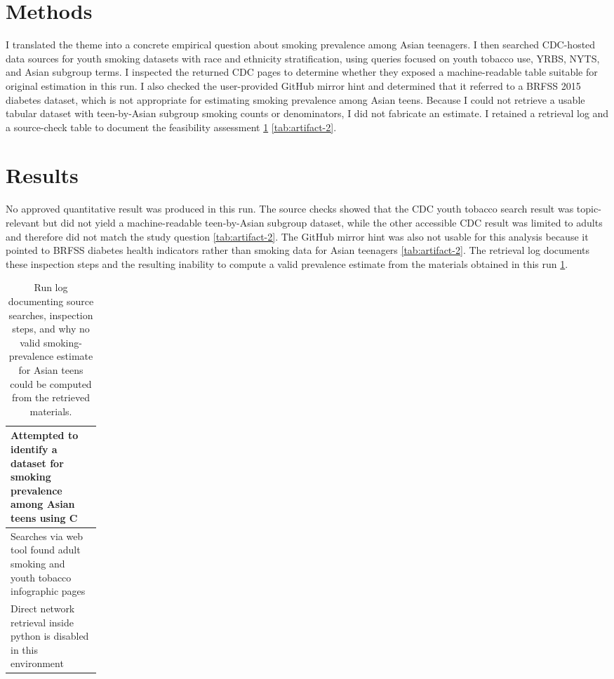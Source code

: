 \documentclass[11pt]{article}
\begin{document}
\section{Methods}
I translated the theme into a concrete empirical question about smoking prevalence among Asian teenagers. I then searched CDC-hosted data sources for youth smoking datasets with race and ethnicity stratification, using queries focused on youth tobacco use, YRBS, NYTS, and Asian subgroup terms. I inspected the returned CDC pages to determine whether they exposed a machine-readable table suitable for original estimation in this run. I also checked the user-provided GitHub mirror hint and determined that it referred to a BRFSS 2015 diabetes dataset, which is not appropriate for estimating smoking prevalence among Asian teens. Because I could not retrieve a usable tabular dataset with teen-by-Asian subgroup smoking counts or denominators, I did not fabricate an estimate. I retained a retrieval log and a source-check table to document the feasibility assessment \ref{tab:artifact-1} \ref{tab:artifact-2}.

\section{Results}
No approved quantitative result was produced in this run. The source checks showed that the CDC youth tobacco search result was topic-relevant but did not yield a machine-readable teen-by-Asian subgroup dataset, while the other accessible CDC result was limited to adults and therefore did not match the study question \ref{tab:artifact-2}. The GitHub mirror hint was also not usable for this analysis because it pointed to BRFSS diabetes health indicators rather than smoking data for Asian teenagers \ref{tab:artifact-2}. The retrieval log documents these inspection steps and the resulting inability to compute a valid prevalence estimate from the materials obtained in this run \ref{tab:artifact-1}.

\begin{table}[tbp]
\centering
\caption{Run log documenting source searches, inspection steps, and why no valid smoking-prevalence estimate for Asian teens could be computed from the retrieved materials.}
\label{tab:artifact-1}
\begin{tabular}{>{\raggedright\arraybackslash}p{0.15\linewidth}}
\toprule
Attempted to identify a dataset for smoking prevalence among Asian teens using C \\
\midrule
Searches via web tool found adult smoking and youth tobacco infographic pages \\
Direct network retrieval inside python is disabled in this environment \\
\bottomrule
\end{tabular}
\end{table}
\end{document}
